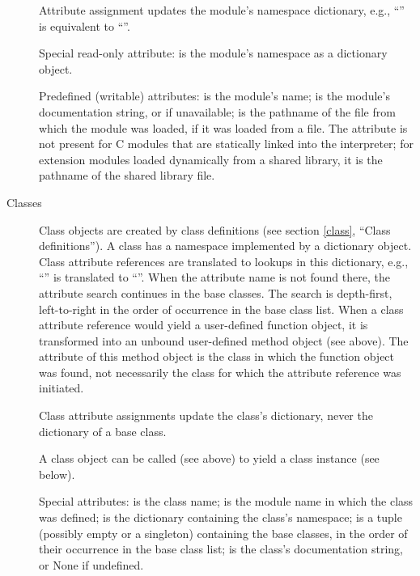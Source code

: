 \begin{description}
Attribute assignment updates the module's namespace dictionary,
e.g., ``'' is equivalent to ``''.

Special read-only attribute:  is the module's
namespace as a dictionary object.

Predefined (writable) attributes: 
is the module's name;  is the
module's documentation string, or
 if unavailable;  is the pathname of the
file from which the module was loaded, if it was loaded from a file.
The  attribute is not present for C{} modules that are
statically linked into the interpreter; for extension modules loaded
dynamically from a shared library, it is the pathname of the shared
library file.

\item[Classes]
Class objects are created by class definitions (see section
\ref{class}, ``Class definitions'').
A class has a namespace implemented by a dictionary object.
Class attribute references are translated to
lookups in this dictionary,
e.g., ``'' is translated to ``''.
When the attribute name is not found
there, the attribute search continues in the base classes.  The search
is depth-first, left-to-right in the order of occurrence in the
base class list.
When a class attribute reference would yield a user-defined function
object, it is transformed into an unbound user-defined method object
(see above).  The  attribute of this method object is the
class in which the function object was found, not necessarily the
class for which the attribute reference was initiated.

Class attribute assignments update the class's dictionary, never the
dictionary of a base class.

A class object can be called (see above) to yield a class instance (see
below).

Special attributes:  is the class name;
 is the module name in which the class was defined;
 is the dictionary containing the class's namespace;
 is a tuple (possibly empty or a singleton)
containing the base classes, in the order of their occurrence in the
base class list;  is the class's documentation string,
or None if undefined.


\end{description}
